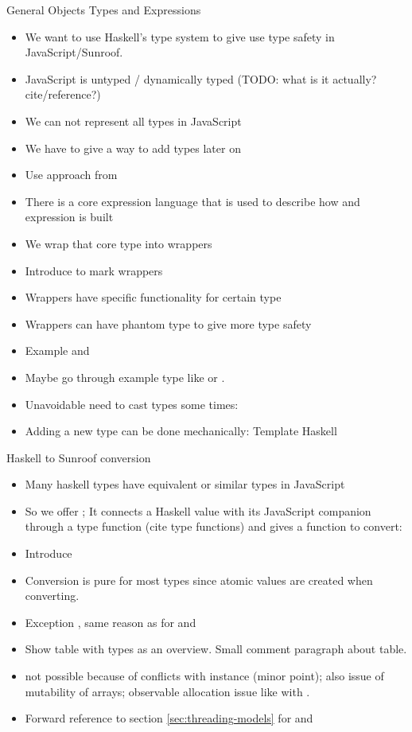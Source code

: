 General Objects Types and Expressions
\begin{itemize}
\item We want to use Haskell's type system to give use type safety in JavaScript/Sunroof.
\item JavaScript is untyped / dynamically typed (TODO: what is it actually? cite/reference?)
\item We can not represent all types in JavaScript
\item We have to give a way to add types later on
\item Use approach from \cite{Svenningsson:12:CombiningEmbedding}
\item There is a core expression language that is used to describe how and expression is built
\item We wrap that core type into wrappers
\item Introduce  to mark wrappers
\item Wrappers have specific functionality for certain type
\item Wrappers can have phantom type to give more type safety
\item Example  and 
\item Maybe go through example type like  or \Src{()}.
\item Unavoidable need to cast types some times: 
\item Adding a new type can be done mechanically: Template Haskell
\end{itemize}
Haskell to Sunroof conversion
\begin{itemize}
\item Many haskell types have equivalent or similar types in JavaScript
\item So we offer ; It connects a Haskell value with 
its JavaScript companion through a type function (cite type functions)
and gives a function to convert: 
\item Introduce 
\item Conversion is pure for most types since atomic values 
are created when converting.
\item Exception , same reason as for  and 
\item Show table with types as an overview. Small comment paragraph about table.
\item {} not possible because of conflicts with 
instance (minor point); also issue of mutability of arrays; observable 
allocation issue like with .
\item Forward reference to section \ref{sec:threading-models} for 
and 
\end{itemize}
